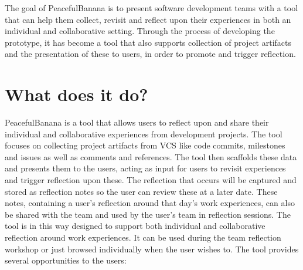 The goal of PeacefulBanana is to present software development teams with a tool that can help them collect, revisit and reflect upon their experiences in both an individual and collaborative setting. Through the process of developing the prototype, it has become a tool that also supports collection of project artifacts and the presentation of these to users, in order to promote and trigger reflection. 

\section{What does it do?}
\label{whatdoesitdo}
PeacefulBanana is a tool that allows users to reflect upon and share their individual and collaborative experiences from development projects. The tool focuses on collecting project artifacts from VCS like code commits, milestones and issues as well as comments and references. The tool then scaffolds these data and presents them to the users, acting as input for users to revisit experiences and trigger reflection upon these. The reflection that occurs will be captured and stored as reflection notes so the user can review these at a later date. These notes, containing a user's reflection around that day's work experiences, can also be shared with the team and used by the user's team in reflection sessions. The tool is in this way designed to support both individual and collaborative reflection around work experiences. It can be used during the team reflection workshop or just browsed individually when the user wishes to. The tool provides several opportunities to the users:
